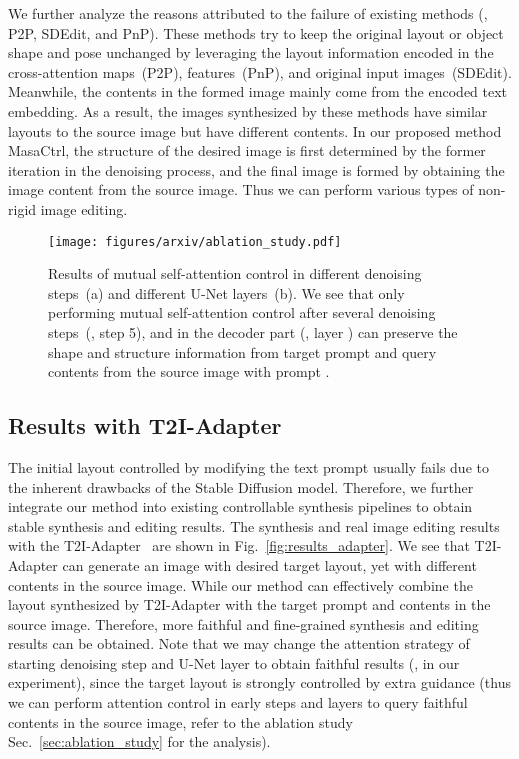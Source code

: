 \documentclass[10pt,twocolumn,letterpaper]{article}
\begin{document}
We further analyze the reasons attributed to the failure of existing methods (\ie, P2P, SDEdit, and PnP). These methods try to keep the original layout or object shape and pose unchanged by leveraging the layout information encoded in the cross-attention maps~(P2P), features~(PnP), and original input images~(SDEdit). Meanwhile, the contents in the formed image mainly come from the encoded text embedding. As a result, the images synthesized by these methods have similar layouts to the source image but have different contents. 
In our proposed method MasaCtrl, the structure of the desired image is first determined by the former iteration in the denoising process, and the final image is formed by obtaining the image content from the source image. Thus we can perform various types of non-rigid image editing.

\begin{figure*}[!t]
    \centering
    \texttt{[image: figures/arxiv/ablation\_study.pdf]}
    \caption{Results of mutual self-attention control in different denoising steps~(a) and different U-Net layers~(b). We see that only performing mutual self-attention control after several denoising steps~(\eg, step 5), and in the decoder part (\eg, layer ) can preserve the shape and structure information from target prompt  and query contents from the source image with prompt .}
    \label{fig:step_layer_analysis}
\end{figure*}

\subsection{Results with T2I-Adapter}
The initial layout controlled by modifying the text prompt usually fails due to the inherent drawbacks of the Stable Diffusion model. Therefore, we further integrate our method into existing controllable synthesis pipelines to obtain stable synthesis and editing results. The synthesis and real image editing results with the T2I-Adapter~\cite{mou2023t2i} are shown in Fig.~\ref{fig:results_adapter}. We see that T2I-Adapter can generate an image with desired target layout, yet with different contents in the source image. While our method can effectively combine the layout synthesized by T2I-Adapter with the target prompt and contents in the source image. Therefore, more faithful and fine-grained synthesis and editing results can be obtained. Note that we may change the attention strategy of starting denoising step  and U-Net layer  to obtain faithful results (,  in our experiment), since the target layout is strongly controlled by extra guidance (thus we can perform attention control in early steps and layers to query faithful contents in the source image, refer to the ablation study Sec.~\ref{sec:ablation_study} for the analysis). 
\end{document}
